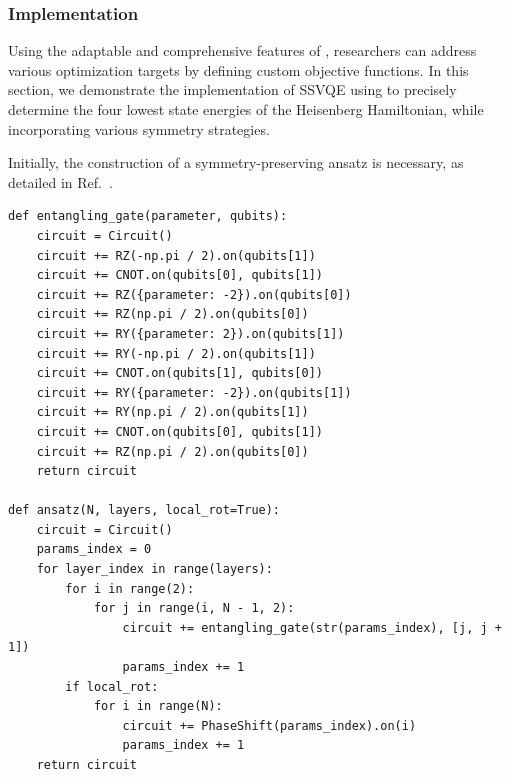 \subsubsection{Implementation}
Using the adaptable and comprehensive features of \MindQuantum, researchers can address various optimization targets by defining custom objective functions. In this section, we demonstrate the implementation of SSVQE using \MindQuantum to precisely determine the four lowest state energies of the Heisenberg Hamiltonian, while incorporating various symmetry strategies.

Initially, the construction of a symmetry-preserving ansatz is necessary, as detailed in Ref.~\cite{Lyu2023symmetryenhanced}.
\begin{lstlisting}
def entangling_gate(parameter, qubits):
    circuit = Circuit()
    circuit += RZ(-np.pi / 2).on(qubits[1])
    circuit += CNOT.on(qubits[0], qubits[1])
    circuit += RZ({parameter: -2}).on(qubits[0])
    circuit += RZ(np.pi / 2).on(qubits[0])
    circuit += RY({parameter: 2}).on(qubits[1])
    circuit += RY(-np.pi / 2).on(qubits[1])
    circuit += CNOT.on(qubits[1], qubits[0])
    circuit += RY({parameter: -2}).on(qubits[1])
    circuit += RY(np.pi / 2).on(qubits[1])
    circuit += CNOT.on(qubits[0], qubits[1])
    circuit += RZ(np.pi / 2).on(qubits[0])
    return circuit

def ansatz(N, layers, local_rot=True):
    circuit = Circuit()
    params_index = 0
    for layer_index in range(layers):
        for i in range(2):
            for j in range(i, N - 1, 2):
                circuit += entangling_gate(str(params_index), [j, j + 1])
                params_index += 1
        if local_rot:
            for i in range(N):
                circuit += PhaseShift(params_index).on(i)
                params_index += 1
    return circuit
\end{lstlisting}

